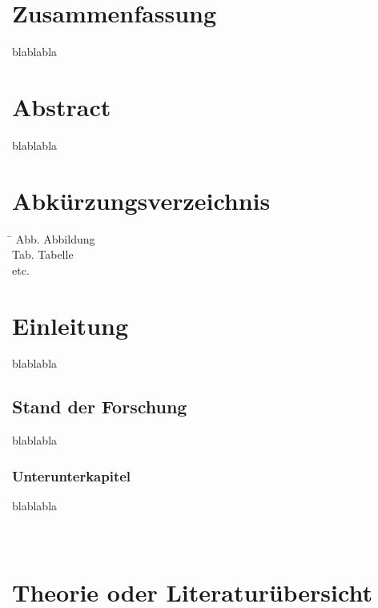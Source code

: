 \documentclass[a4paper,11pt,twoside]{article}
\begin{document}
	
	\newpage
	\section*{Zusammenfassung}
	blablabla
	
	\newpage
	\section*{Abstract}
	blablabla
	
	\newpage
	\section*{Abkürzungsverzeichnis}
	\begin{tabbing}
		\hspace*{3cm} \= \kill
		Abb. \> Abbildung\\
		Tab. \> Tabelle\\
		etc.
	\end{tabbing}
	
	
	\newpage
	\tableofcontents
	\thispagestyle{empty}
	
	
	
	\newpage
	\pagestyle{standard} %
	\section{Einleitung}
	blablabla
	\subsection{Stand der Forschung}
	blablabla
	\subsubsection{Unterunterkapitel}
	blablabla \parencite{gislerProjectWorkResearch2023}
	\\
	\textcite{wust-galleyModelbasedCarbonInventory2020}
	\\
	\
	
	\newpage
	\section{Theorie oder Literaturübersicht}
	
\end{document}
